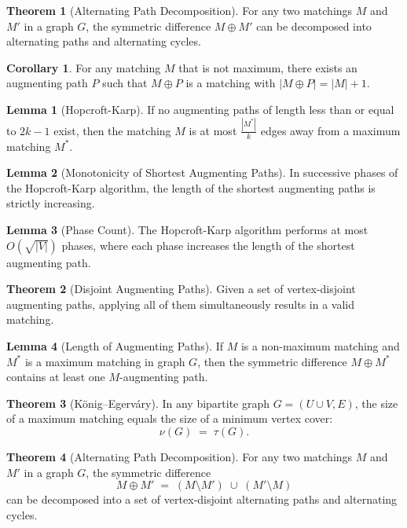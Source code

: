 \documentclass{article}
\theoremstyle{definition}
\newtheorem{theorem}{Theorem}
\newtheorem{lemma}{Lemma}
\newtheorem{corollary}{Corollary}
\begin{document}
\begin{theorem}[Alternating Path Decomposition]
For any two matchings $M$ and $M'$ in a graph $G$, the symmetric difference $M \oplus M'$ can be decomposed into alternating paths and alternating cycles.
\end{theorem}

\begin{corollary}
For any matching $M$ that is not maximum, there exists an augmenting path $P$ such that $M \oplus P$ is a matching with $|M \oplus P| = |M| + 1$.
\end{corollary}

\begin{lemma}[Hopcroft-Karp]
If no augmenting paths of length less than or equal to $2k-1$ exist, then the matching $M$ is at most $\frac{|M^*|}{k}$ edges away from a maximum matching $M^*$.
\end{lemma}

\begin{lemma}[Monotonicity of Shortest Augmenting Paths]
In successive phases of the Hopcroft-Karp algorithm, the length of the shortest augmenting paths is strictly increasing.
\end{lemma}

\begin{lemma}[Phase Count]
The Hopcroft-Karp algorithm performs at most $O(\sqrt{|V|})$ phases, where each phase increases the length of the shortest augmenting path.
\end{lemma}

\begin{theorem}[Disjoint Augmenting Paths]
Given a set of vertex-disjoint augmenting paths, applying all of them simultaneously results in a valid matching.
\end{theorem}

\begin{lemma}[Length of Augmenting Paths]
If $M$ is a non-maximum matching and $M^*$ is a maximum matching in graph $G$, then the symmetric difference $M \oplus M^*$ contains at least one $M$-augmenting path.
\end{lemma}

\begin{theorem}[König–Egerváry]
In any bipartite graph $G=(U\cup V,E)$, the size of a maximum matching equals the size of a minimum vertex cover:
\[
\nu(G) \;=\;\tau(G).
\]
\end{theorem}

\begin{theorem}[Alternating Path Decomposition]
For any two matchings $M$ and $M'$ in a graph $G$, the symmetric difference
\[
M \oplus M' \;=\;(M\setminus M')\;\cup\;(M'\setminus M)
\]
can be decomposed into a set of vertex‐disjoint alternating paths and alternating cycles.
\end{theorem}
\end{document}
